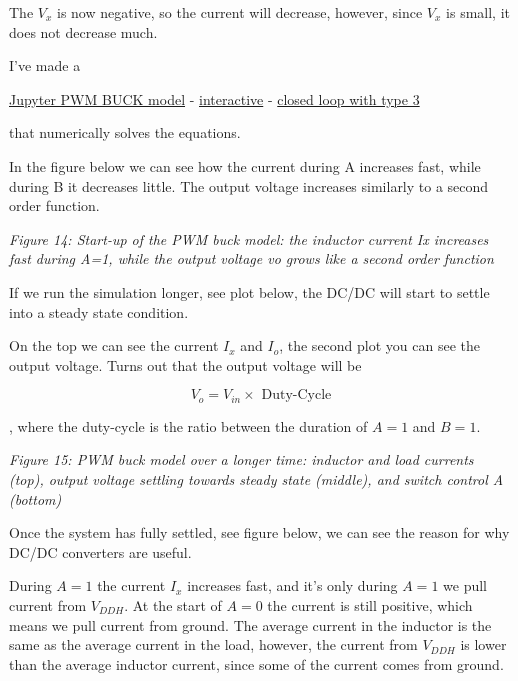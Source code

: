 The \(V_x\) is now negative, so the current will decrease, however,
since \(V_x\) is small, it does not decrease much.

I've made a

\href{https://github.com/wulffern/aic2026/blob/main/jupyter/buck.ipynb}{Jupyter
PWM BUCK model} -
\href{https://wulffern.github.io/aic2026/assets/examples/buck.html}{interactive}
-
\href{https://wulffern.github.io/aic2026/assets/examples/buck-type3.html}{closed
loop with type 3}

that numerically solves the equations.

In the figure below we can see how the current during A increases fast,
while during B it decreases little. The output voltage increases
similarly to a second order function.


{
\centering
{}
}

\emph{Figure 14: Start-up of the PWM buck model: the inductor current Ix
increases fast during A=1, while the output voltage vo grows like a
second order function}

If we run the simulation longer, see plot below, the DC/DC will start to
settle into a steady state condition.

On the top we can see the current \(I_x\) and \(I_o\), the second plot
you can see the output voltage. Turns out that the output voltage will
be

\[ V_o = V_{in} \times \text{ Duty-Cycle}\]

, where the duty-cycle is the ratio between the duration of \(A=1\) and
\(B=1\).


{
\centering
{}
}

\emph{Figure 15: PWM buck model over a longer time: inductor and load
currents (top), output voltage settling towards steady state (middle),
and switch control A (bottom)}

Once the system has fully settled, see figure below, we can see the
reason for why DC/DC converters are useful.

During \(A=1\) the current \(I_x\) increases fast, and it's only during
\(A=1\) we pull current from \(V_{DDH}\). At the start of \(A=0\) the
current is still positive, which means we pull current from ground. The
average current in the inductor is the same as the average current in
the load, however, the current from \(V_{DDH}\) is lower than the
average inductor current, since some of the current comes from ground.

